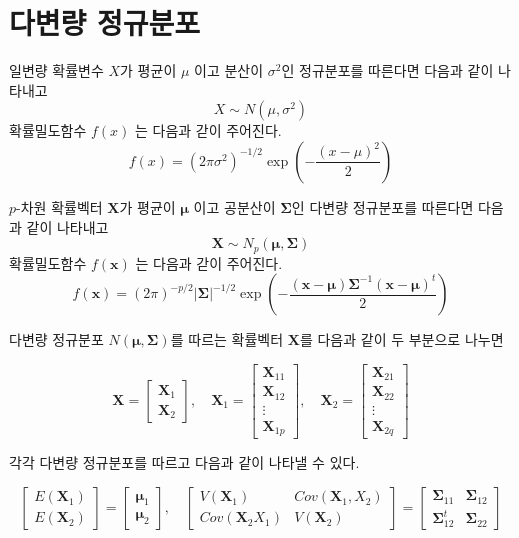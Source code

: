 \documentclass[
]{book}
\theoremstyle{definition}
\theoremstyle{definition}
\theoremstyle{definition}
\theoremstyle{remark}
\begin{document}
\hypertarget{uxb2e4uxbcc0uxb7c9-uxc815uxaddcuxbd84uxd3ec}{%
\section{다변량 정규분포}\label{uxb2e4uxbcc0uxb7c9-uxc815uxaddcuxbd84uxd3ec}}

일변량 확률변수 \(X\)가 평균이 \(\mu\) 이고 분산이 \(\sigma^2\)인 정규분포를 따른다면 다음과 같이 나타내고 \[ X \sim N(\mu, \sigma^2 ) \]
확률밀도함수 \(f(x)\) 는 다음과 갇이 주어진다.
\[ f(x) = (2 \pi \sigma^2)^{-1/2} \exp \left ( - \frac{(x-\mu)^2}{2} \right ) \]

\(p\)-차원 확률벡터 \(\bm X\)가 평균이 \(\bm \mu\) 이고 공분산이 \(\bm \Sigma\)인
다변량 정규분포를 따른다면 다음과 같이 나타내고 \[ \bm X \sim N_p(\bm \mu, \bm \Sigma ) \]
확률밀도함수 \(f(\bm x)\) 는 다음과 갇이 주어진다.
\[ f(\bm x) = (2 \pi)^{-p/2} | \bm \Sigma|^{-1/2} 
   \exp \left ( - \frac{(\bm x-\bm \mu) \bm \Sigma^{-1}(\bm x-\bm \mu)^t}{2} \right ) \]

다변량 정규분포 \(N(\bm \mu, \bm \Sigma)\)를 따르는 확률벡터 \(\bm X\)를 다음과 같이 두 부분으로 나누면

\[ 
  \bm X = 
    \begin{bmatrix}
  \bm X_1 \\
  \bm X_2
  \end{bmatrix}, \quad
  \bm X_1 = 
    \begin{bmatrix}
  \bm X_{11} \\
  \bm X_{12} \\
  \bm \vdots \\
  \bm X_{1p}
  \end{bmatrix}, \quad 
  \bm X_2= 
    \begin{bmatrix}
  \bm X_{21} \\
  \bm X_{22} \\
  \bm \vdots \\
  \bm X_{2q}
  \end{bmatrix}
  \]

각각 다변량 정규분포를 따르고 다음과 같이 나타낼 수 있다.

\[ 
  \begin{bmatrix}
  E(\bm X_1) \\
  E(\bm X_2)
  \end{bmatrix}
  =
    \begin{bmatrix}
  \bm \mu_1 \\
  \bm \mu_2
  \end{bmatrix}
  , \quad 
  \begin{bmatrix}
  V(\bm X_1) & Cov(\bm X_1, X_2) \\
  Cov(\bm X_2 X_1) & V(\bm X_2)
  \end{bmatrix}
  =
    \begin{bmatrix}
  \bm \Sigma_{11} & \bm \Sigma_{12} \\
  \bm \Sigma^t_{12} & \bm \Sigma_{22}
  \end{bmatrix}
  \]
\end{document}
